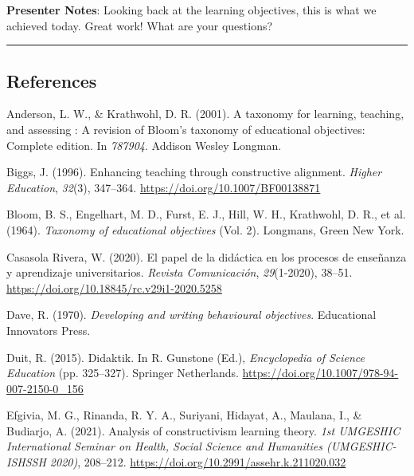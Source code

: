 \documentclass[
  letterpaper,
  DIV=11,
  numbers=noendperiod]{scrartcl}
\newlength{\cslhangindent}
\newenvironment{CSLReferences}[2] %
 {\begin{list}{}{%
  \setlength{\itemindent}{0pt}
  \setlength{\leftmargin}{0pt}
  \setlength{\parsep}{0pt}
  \ifodd #1
   \setlength{\leftmargin}{\cslhangindent}
   \setlength{\itemindent}{-1\cslhangindent}
  \fi
  \setlength{\itemsep}{#2\baselineskip}}}
 {\end{list}}
\begin{document}
\textbf{Presenter Notes}: Looking back at the learning objectives, this
is what we achieved today. Great work! What are your questions?

\begin{center}\rule{0.5\linewidth}{0.5pt}\end{center}

\subsection{References}\label{references}

\protect{}\label{refs}
\begin{CSLReferences}{1}{0}
Anderson, L. W., \& Krathwohl, D. R. (2001). A taxonomy for learning,
teaching, and assessing : A revision of {Bloom}'s taxonomy of
educational objectives: Complete edition. In \emph{787904}. Addison
Wesley Longman.

Biggs, J. (1996). Enhancing teaching through constructive alignment.
\emph{Higher Education}, \emph{32}(3), 347--364.
\url{https://doi.org/10.1007/BF00138871}

{Bloom, B. S., Engelhart, M. D., Furst, E. J., Hill, W. H., Krathwohl,
D. R., et al.} (1964). \emph{Taxonomy of educational objectives} (Vol.
2). Longmans, Green New York.

Casasola Rivera, W. (2020). El papel de la didáctica en los procesos de
enseñanza y aprendizaje universitarios. \emph{Revista Comunicación},
\emph{29}(1-2020), 38--51.
\url{https://doi.org/10.18845/rc.v29i1-2020.5258}

Dave, R. (1970). \emph{Developing and writing behavioural objectives}.
Educational Innovators Press.

Duit, R. (2015). Didaktik. In R. Gunstone (Ed.), \emph{Encyclopedia of
{Science Education}} (pp. 325--327). Springer Netherlands.
\url{https://doi.org/10.1007/978-94-007-2150-0_156}

Efgivia, M. G., Rinanda, R. Y. A., Suriyani, Hidayat, A., Maulana, I.,
\& Budiarjo, A. (2021). Analysis of constructivism learning theory.
\emph{1st {UMGESHIC International Seminar} on {Health}, {Social Science}
and {Humanities} ({UMGESHIC-ISHSSH} 2020)}, 208--212.
\url{https://doi.org/10.2991/assehr.k.211020.032}


\end{CSLReferences}
\end{document}
